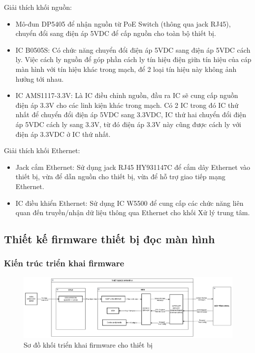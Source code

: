 Giải thích khối nguồn:
\begin{itemize}
    \item Mô-đun DP5405 để nhận nguồn từ PoE Switch (thông qua jack RJ45), chuyển đổi sang điện áp 5VDC để cấp nguồn cho toàn bộ thiết bị.
    
    \item IC B0505S: Có chức năng chuyển đổi điện áp 5VDC sang điện áp 5VDC cách ly. Việc cách ly nguồn để góp phần cách ly tín hiệu điện giữa tín hiệu của cáp màn hình với tín hiệu khác trong mạch, để 2 loại tín hiệu này không ảnh hưởng tới nhau.
    
    \item IC AMS1117-3.3V: Là IC điều chỉnh nguồn, đầu ra IC sẽ cung cấp nguồn điện áp 3.3V cho các linh kiện khác trong mạch. Có 2 IC trong đó IC thứ nhất để chuyển đổi điện áp 5VDC sang 3.3VDC, IC thứ hai chuyển đổi điện áp 5VDC cách ly sang 3.3V, từ đó điện áp 3.3V này cũng được cách ly với điện áp 3.3VDC ở IC thứ nhất. 
\end{itemize}

Giải thích khối Ethernet:

\begin{itemize}
    \item Jack cắm Ethernet: Sử dụng jack RJ45 HY931147C để cắm dây Ethernet vào thiết bị, vừa để dẫn nguồn cho thiết bị, vừa để hỗ trợ giao tiếp mạng Ethernet.
    \item IC điều khiển Ethernet: Sử dụng IC W5500 để cung cấp các chức năng liên quan đến truyền/nhận dữ liệu thông qua Ethernet cho khối Xử lý trung tâm.
\end{itemize}

\subsection{Thiết kế firmware thiết bị đọc màn hình}

\subsubsection {Kiến trúc triển khai firmware}

\begin{figure}[!ht]
    \centering
    \includegraphics[width=1.0\linewidth]{Figures/Chap3_Device-block-firmware-architecture.png}
    \caption{Sơ đồ khối triển khai firmware cho thiết bị}
    \label{fig:hinh3.8}
\end{figure}

